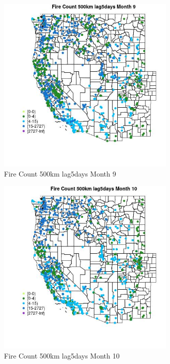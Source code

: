 \begin{figure} 
\centering  
\includegraphics[width=0.77\textwidth]{Code_Outputs/Report_ML_input_PM25_Step4_part_f_de_duplicated_aveswNAs_MapObsMo9Fire_Count_500km_lag5days.jpg} 
\caption{\label{fig:Report_ML_input_PM25_Step4_part_f_de_duplicated_aveswNAsMapObsMo9Fire_Count_500km_lag5days}Fire Count 500km lag5days Month 9} 
\end{figure} 
 

\begin{figure} 
\centering  
\includegraphics[width=0.77\textwidth]{Code_Outputs/Report_ML_input_PM25_Step4_part_f_de_duplicated_aveswNAs_MapObsMo10Fire_Count_500km_lag5days.jpg} 
\caption{\label{fig:Report_ML_input_PM25_Step4_part_f_de_duplicated_aveswNAsMapObsMo10Fire_Count_500km_lag5days}Fire Count 500km lag5days Month 10} 
\end{figure} 
 

